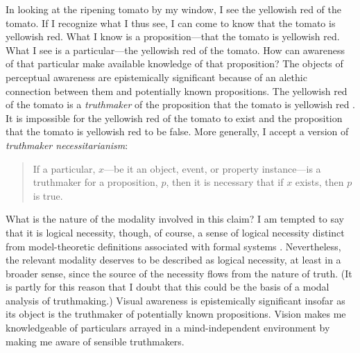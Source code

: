 \documentclass[12pt]{article}
\begin{document}
In looking at the ripening tomato by my window, I see the yellowish red of the tomato. If I recognize what I thus see, I can come to know that the tomato is yellowish red. What I know is a proposition---that the tomato is yellowish red. What I see is a particular---the yellowish red of the tomato. How can awareness of that particular make available knowledge of that proposition? The objects of perceptual awareness are epistemically significant because of an alethic connection between them and potentially known propositions. The yellowish red of the tomato is a \emph{truthmaker} of the proposition that the tomato is yellowish red \citep[see][]{Johnston:2006uq}. It is impossible for the yellowish red of the tomato to exist and the proposition that the tomato is yellowish red to be false. More generally, I accept a version of \emph{truthmaker necessitarianism}:
\begin{quote}
	If a particular, \( x \)---be it an object, event, or property instance---is a truthmaker for a proposition, \( p \), then it is necessary that if \( x \) exists, then \( p \) is true. 
\end{quote}
\citep[for a survey of recent work on truthmakers see][]{Rodriguez-Pereyra:2006fk} What is the nature of the modality involved in this claim? I am tempted to say that it is logical necessity, though, of course, a sense of logical necessity distinct from model-theoretic definitions associated with formal systems  \citep[for doubts about model-theoretic definitions of logical necessity see][]{Etchemendy:1988et,Etchemendy:1988sa}. Nevertheless, the relevant modality deserves to be described as logical necessity, at least in a broader sense, since the source of the necessity flows from the nature of truth. (It is partly for this reason that I doubt that this could be the basis of a modal analysis of truthmaking.) Visual awareness is epistemically significant insofar as its object is the truthmaker of potentially known propositions. Vision makes me knowledgeable of particulars arrayed in a mind-independent environment by making me aware of sensible truthmakers.
\end{document}
